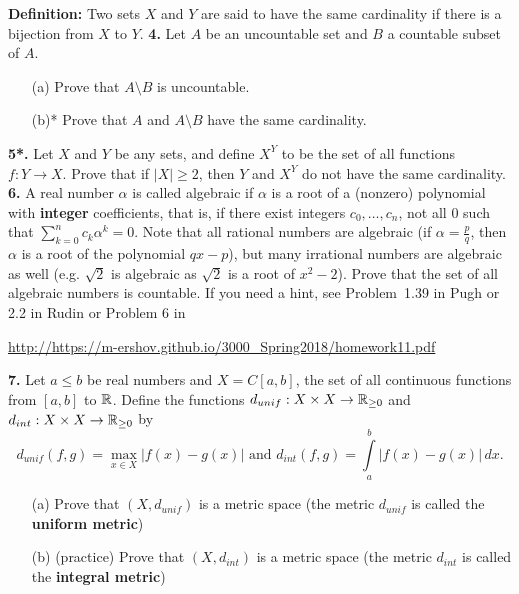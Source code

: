 \documentclass[11pt]{amsart}
\begin{document}
\skv
{\bf Definition:} Two sets $X$ and $Y$ are said to have the same cardinality
if there is a bijection from $X$ to $Y$.
\skv
{\bf 4.} Let $A$ be an uncountable set and $B$ a countable subset of $A$.
\begin{itemize}
\item[(a)] Prove that $A\setminus B$ is uncountable.
\item[(b)*] Prove that $A$ and $A\setminus B$ have the same cardinality.
\end{itemize}
\skv
{\bf 5*.} Let $X$ and $Y$ be any sets, and define $X^Y$ to be the
set of all functions $f: Y\to X$. Prove that if $|X|\geq 2$, then
$Y$ and $X^Y$ do not have the same cardinality. 
\skv
{\bf 6.} A real number $\alpha$ is called algebraic if $\alpha$ is a root of a (nonzero) polynomial with 
{\bf integer} coefficients, that is, if there exist integers $c_0,\ldots,c_n$, not all $0$ such that $\sum\limits_{k=0}^n c_k \alpha^k=0$. Note that all rational numbers are algebraic (if $\alpha=\frac{p}{q}$, then $\alpha$ is a root of the polynomial $qx-p$), but many irrational numbers are algebraic as well (e.g. $\sqrt{2}$ is algebraic as $\sqrt{2}$ is a root of $x^2-2$). 
Prove that the set of all algebraic numbers is countable.
\skv
If you need a hint, see Problem~1.39 in Pugh or 2.2 in Rudin or Problem 6 in
\skv
\centerline{
\url{http://https://m-ershov.github.io/3000_Spring2018/homework11.pdf}
}
\skv
{\bf 7.} Let $a\leq b$ be real numbers and $X=C[a,b]$, the set of all continuous functions
from $[a,b]$ to ${\mathbb R}$. Define the functions $d_{unif}:X\times X\to{\mathbb R}_{\geq 0}$ and $d_{int}:X\times X\to{\mathbb R}_{\geq 0}$ 
by $$d_{unif}(f,g)=\max\limits_{x\in X} |f(x)-g(x)| \mbox{ and }d_{int}(f,g)=\int\limits_{a}^b |f(x)-g(x)|\,dx.$$
\begin{itemize}
\item[(a)] Prove that $(X,d_{unif})$ is a metric space (the metric $d_{unif}$ is called the {\bf uniform metric})
\item[(b)] (practice) Prove that $(X,d_{int})$ is a metric space (the metric $d_{int}$ is called the {\bf integral metric})
\end{itemize}
\skv
\end{document}
